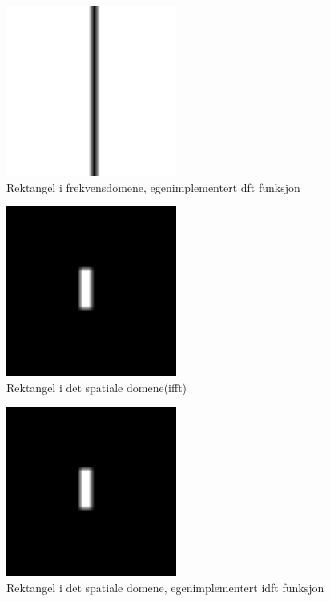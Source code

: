 \documentclass[a4paper, 12pt]{article}
\begin{document}
\begin{figure}[h]
  \centering
  \includegraphics[width=0.5\textwidth]{images/myfft-rektangel}
  \caption{Rektangel i frekvensdomene, egenimplementert dft funksjon}
  \label{fig:dft}
\end{figure}


\begin{figure}[h]
  \centering
  \includegraphics[width=0.5\textwidth]{images/ifft-rektangel}
  \caption{Rektangel i det spatiale domene(ifft)}
  \label{fig:ifft}
\end{figure}


\begin{figure}[h]
  \centering
  \includegraphics[width=0.5\textwidth]{images/idft-rektangel}
  \caption{Rektangel i det spatiale domene, egenimplementert idft funksjon}
  \label{fig:idft}
\end{figure}
\end{document}
